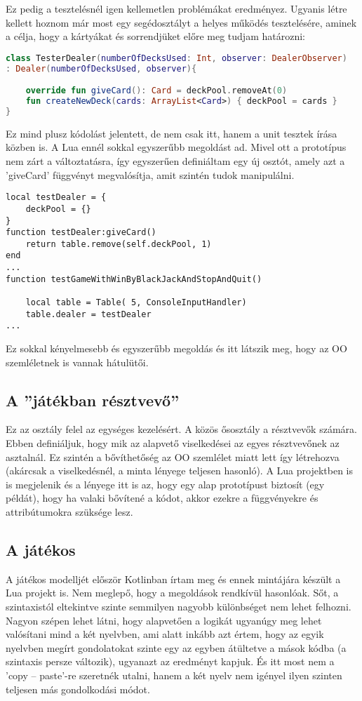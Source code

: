 Ez pedig a tesztelésnél igen kellemetlen problémákat eredményez. Ugyanis létre kellett hoznom már most egy segédosztályt a helyes működés tesztelésére, aminek a célja, hogy a kártyákat és sorrendjüket előre meg tudjam határozni:
\scriptsize
\begin{lstlisting}[language = Kotlin]
class TesterDealer(numberOfDecksUsed: Int, observer: DealerObserver)
: Dealer(numberOfDecksUsed, observer){

	override fun giveCard(): Card = deckPool.removeAt(0)
	fun createNewDeck(cards: ArrayList<Card>) { deckPool = cards }
}
\end{lstlisting}
\normalsize
Ez mind plusz kódolást jelentett, de nem csak itt, hanem a unit tesztek írása közben is. A Lua ennél sokkal egyszerűbb megoldást ad. Mivel ott a prototípus nem zárt a változtatásra, így egyszerűen definiáltam egy új osztót, amely azt a 'giveCard' függvényt megvalósítja, amit szintén tudok manipulálni. 
\scriptsize
\begin{lstlisting}[style=Lua]
local testDealer = {
	deckPool = {}
}
function testDealer:giveCard()
	return table.remove(self.deckPool, 1)
end
...
function testGameWithWinByBlackJackAndStopAndQuit()

	local table = Table( 5, ConsoleInputHandler)
	table.dealer = testDealer
...
\end{lstlisting}
\normalsize
Ez sokkal kényelmesebb és egyszerűbb megoldás és itt látszik meg, hogy az OO szemléletnek is vannak hátulütői.
\subsection{A ''játékban résztvevő''}

Ez az osztály felel az egységes kezelésért. A közös ősosztály a résztvevők számára. Ebben definiáljuk, hogy mik az alapvető viselkedései az egyes résztvevőnek az asztalnál. Ez szintén a bővíthetőség az OO szemlélet miatt lett így létrehozva (akárcsak a viselkedésnél, a minta lényege teljesen hasonló). A Lua projektben is is megjelenik és a lényege itt is az, hogy egy alap prototípust biztosít (egy példát), hogy ha valaki bővítené a kódot, akkor ezekre a függvényekre és attribútumokra szüksége lesz.

\subsection{A játékos}

A játékos modelljét először Kotlinban írtam meg és ennek mintájára készült a Lua projekt is. Nem meglepő, hogy a megoldások rendkívül hasonlóak. Sőt, a szintaxistól eltekintve szinte semmilyen nagyobb különbséget nem lehet felhozni. Nagyon szépen lehet látni, hogy alapvetően a logikát ugyanúgy meg lehet valósítani mind a két nyelvben, ami alatt inkább azt értem, hogy az egyik nyelvben megírt gondolatokat szinte egy az egyben átültetve a mások kódba (a szintaxis persze változik), ugyanazt az eredményt kapjuk. És itt most nem a 'copy -- paste'-re szeretnék utalni, hanem a két nyelv nem igényel ilyen szinten teljesen más gondolkodási módot.

